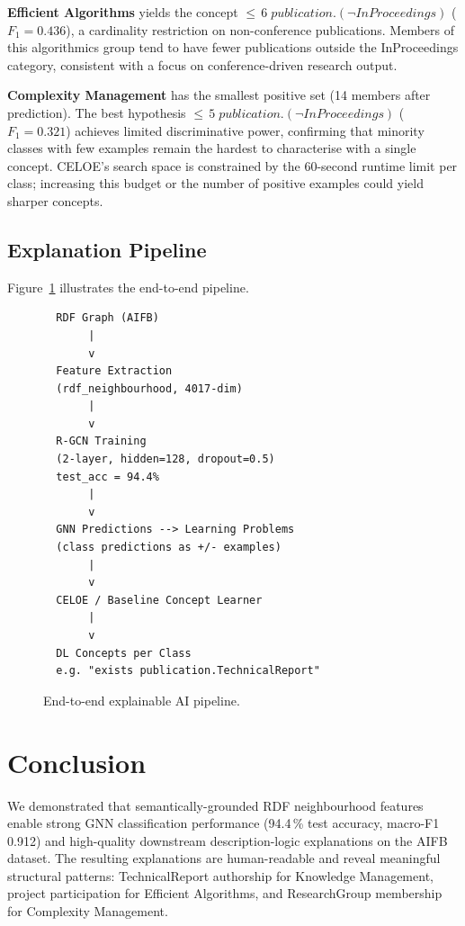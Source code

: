 \documentclass[runningheads]{llncs}
\begin{document}
\textbf{Efficient Algorithms} yields the concept
${\leq}\,6\;\mathit{publication}.(\neg\mathit{InProceedings})$
($F_1 = 0.436$), a cardinality restriction on non-conference publications.
Members of this algorithmics group tend to have fewer publications outside the InProceedings
category, consistent with a focus on conference-driven research output.

\textbf{Complexity Management} has the smallest positive set (14 members after prediction).
The best hypothesis ${\leq}\,5\;\mathit{publication}.(\neg\mathit{InProceedings})$
($F_1 = 0.321$) achieves limited discriminative power, confirming that minority classes
with few examples remain the hardest to characterise with a single concept.
CELOE's search space is constrained by the 60-second runtime limit per class;
increasing this budget or the number of positive examples could yield sharper concepts.

\subsection{Explanation Pipeline}

Figure~\ref{fig:pipeline} illustrates the end-to-end pipeline.

\begin{figure}[ht]
\centering
\begin{verbatim}
  RDF Graph (AIFB)
       |
       v
  Feature Extraction
  (rdf_neighbourhood, 4017-dim)
       |
       v
  R-GCN Training
  (2-layer, hidden=128, dropout=0.5)
  test_acc = 94.4%
       |
       v
  GNN Predictions --> Learning Problems
  (class predictions as +/- examples)
       |
       v
  CELOE / Baseline Concept Learner
       |
       v
  DL Concepts per Class
  e.g. "exists publication.TechnicalReport"
\end{verbatim}
\caption{End-to-end explainable AI pipeline.}
\label{fig:pipeline}
\end{figure}

\section{Conclusion}

We demonstrated that semantically-grounded RDF neighbourhood features enable strong GNN
classification performance (94.4\,\% test accuracy, macro-F1 0.912) and high-quality
downstream description-logic explanations on the AIFB dataset.
The resulting explanations are human-readable and reveal meaningful structural patterns:
TechnicalReport authorship for Knowledge Management,
project participation for Efficient Algorithms,
and ResearchGroup membership for Complexity Management.
\end{document}
